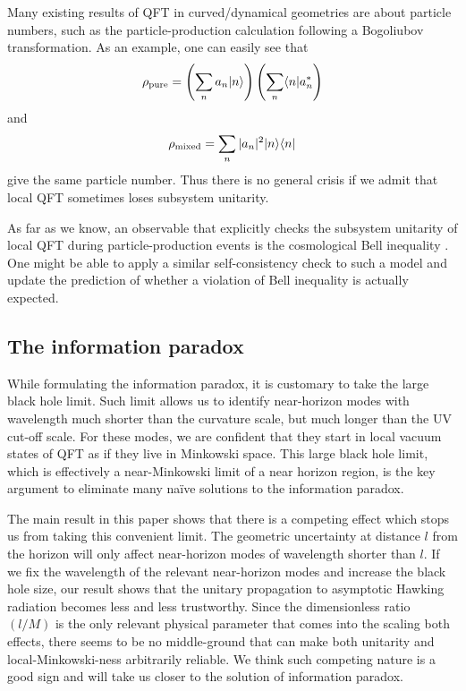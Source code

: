 \documentclass[aps,showpacs,onecolumn,floats,prd,superscriptaddress,nofootinbib]{revtex4-1}
\begin{document}
Many existing results of QFT in curved/dynamical geometries are about particle numbers, such as the particle-production calculation following a Bogoliubov transformation. 
As an example, one can easily see that
\begin{equation}
\rho_{\rm pure} = \left(\sum_n a_n|n\rangle\right)
\left(\sum_n \langle n| a_n^*\right)
\end{equation}
and
\begin{equation}
\rho_{\rm mixed} = \sum_n |a_n|^2 |n\rangle\langle n|
\end{equation}
give the same particle number. 
Thus there is no general crisis if we admit that local QFT sometimes loses subsystem unitarity. 

As far as we know, an observable that explicitly checks the subsystem unitarity of local QFT during particle-production events is the cosmological Bell inequality \cite{Mal15}. 
One might be able to apply a similar self-consistency check to such a model and update the prediction of whether a violation of Bell inequality is actually expected.


\subsection{The information paradox}

While formulating the information paradox, it is customary to take the large black hole limit.
Such limit allows us to identify near-horizon modes with wavelength much shorter than the curvature scale, but much longer than the UV cut-off scale.
For these modes, we are confident that they start in local vacuum states of QFT as if they live in Minkowski space.
This large black hole limit, which is effectively a near-Minkowski limit of a near horizon region, is the key argument to eliminate many na\"ive solutions to the information paradox.

The main result in this paper shows that there is a competing effect which stops us from taking this convenient limit.
The geometric uncertainty at distance $l$ from the horizon will only affect near-horizon modes of wavelength shorter than $l$.
If we fix the wavelength of the relevant near-horizon modes and increase the black hole size, our result shows that the unitary propagation to asymptotic Hawking radiation becomes less and less trustworthy. 
Since the dimensionless ratio $(l/M)$ is the only relevant physical parameter that comes into the scaling both effects, there seems to be no middle-ground that can make both unitarity and local-Minkowski-ness arbitrarily reliable.
We think such competing nature is a good sign and will take us closer to the solution of information paradox.
\end{document}
